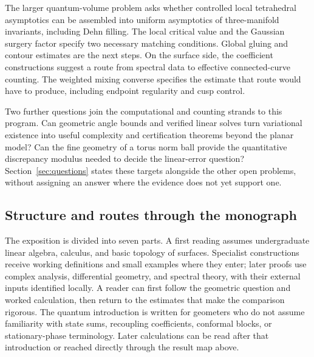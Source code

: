 \documentclass[11pt,a4paper]{article}
\numberwithin{equation}{section}
\theoremstyle{definition}
\theoremstyle{remark}
\begin{document}
The larger quantum-volume problem asks whether controlled local
tetrahedral asymptotics can be assembled into uniform asymptotics of
three-manifold invariants, including Dehn filling. The local critical
value and the Gaussian surgery factor specify two necessary matching
conditions. Global gluing and contour estimates are the next steps.
On the surface side, the coefficient constructions suggest a route from
spectral data to effective connected-curve counting. The weighted
mixing converse specifies the estimate that route would have to produce,
including endpoint regularity and cusp control.

Two further questions join the computational and counting strands to
this program. Can geometric angle bounds and verified linear solves
turn variational existence into useful complexity and certification
theorems beyond the planar model? Can the fine geometry of a torus
norm ball provide the quantitative discrepancy modulus needed to decide
the linear-error question? Section~\ref{sec:questions} states these
targets alongside the other open problems, without assigning an answer
where the evidence does not yet support one.

\subsection*{Structure and routes through the monograph}

The exposition is divided into seven parts. A first reading assumes
undergraduate linear algebra, calculus, and basic topology of surfaces.
Specialist constructions receive working definitions and small examples
where they enter; later proofs use complex analysis, differential geometry,
and spectral theory, with their external inputs identified locally.
A reader can first follow the geometric question and worked calculation,
then return to the estimates that make the comparison rigorous.
The quantum introduction is
written for geometers who do not assume familiarity with state sums,
recoupling coefficients, conformal blocks, or stationary-phase terminology.
Later calculations can be read after that introduction or reached
directly through the result map above.
\end{document}
